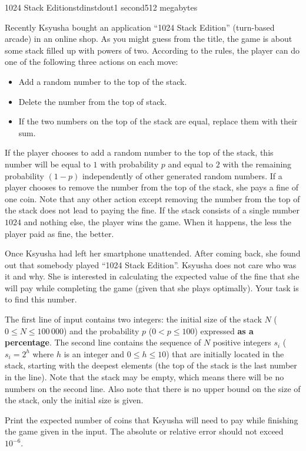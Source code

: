 \begin{problem}{1024 Stack Edition}{stdin}{stdout}{1 second}{512 megabytes}

Recently Ksyusha bought an application ``1024 Stack Edition'' (turn-based arcade) in an online shop. As you might guess from the title, the game is about some stack filled up with powers of two. According to the rules, the player can do one of the following three actions on each move:
\begin{itemize}
\item Add a random number to the top of the stack.
\item Delete the number from the top of stack.
\item If the two numbers on the top of the stack are equal, replace them with their sum.
\end{itemize}

If the player chooses to add a random number to the top of the stack, this number will be equal to $1$ with probability $p$ and equal to $2$ with the remaining probability $(1 - p)$ independently of other generated random numbers. If a player chooses to remove the number from the top of the stack, she pays a fine of one coin. Note that any other action except removing the number from the top of the stack does not lead to paying the fine. If the stack consists of a single number $1024$ and nothing else, the player wins the game. When it happens, the less the player paid as fine, the better.

Once Ksyusha had left her smartphone unattended. After coming back, she found out that somebody played ``1024 Stack Edition''. Ksyusha does not care who was it and why. She is interested in calculating the expected value of the fine that she will pay while completing the game (given that she plays optimally). Your task is to find this number.

\InputFile
The first line of input contains two integers: the initial size of the stack $N$ ($0 \le N \le 100\,000$) and the probability $p$ ($0 < p \le 100$) expressed \textbf{as a percentage}. The second line contains the sequence of $N$ positive integers $s_i$ ($s_i = 2^h$ where $h$ is an integer and $0 \le h \le 10$) that are initially located in the stack, starting with the deepest elements (the top of the stack is the last number in the line). Note that the stack may be empty, which means there will be no numbers on the second line. Also note that there is no upper bound on the size of the stack, only the initial size is given.


\OutputFile
Print the expected number of coins that Ksyusha will need to pay while finishing the game given in the input. The absolute or relative error should not exceed $10^{-6}$.


\Examples

\begin{example}
%
%
\end{example}

\end{problem}
